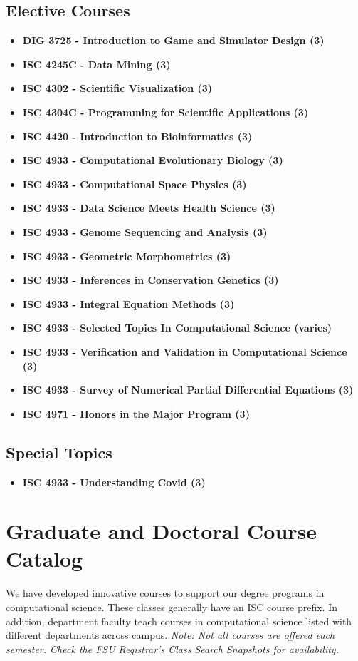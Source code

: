 \documentclass[12pt,a4paper]{article}
\begin{document}
\subsection*{Elective Courses}
\begin{itemize}
    \item \textbf{DIG 3725 - Introduction to Game and Simulator Design (3)}
    \item \textbf{ISC 4245C - Data Mining (3)}
    \item \textbf{ISC 4302 - Scientific Visualization (3)}
    \item \textbf{ISC 4304C - Programming for Scientific Applications (3)}
    \item \textbf{ISC 4420 - Introduction to Bioinformatics (3)}
    \item \textbf{ISC 4933 - Computational Evolutionary Biology (3)}
    \item \textbf{ISC 4933 - Computational Space Physics (3)}
    \item \textbf{ISC 4933 - Data Science Meets Health Science (3)}
    \item \textbf{ISC 4933 - Genome Sequencing and Analysis (3)}
    \item \textbf{ISC 4933 - Geometric Morphometrics (3)}
    \item \textbf{ISC 4933 - Inferences in Conservation Genetics (3)}
    \item \textbf{ISC 4933 - Integral Equation Methods (3)}
    \item \textbf{ISC 4933 - Selected Topics In Computational Science (varies)}
    \item \textbf{ISC 4933 - Verification and Validation in Computational Science (3)}
    \item \textbf{ISC 4933 - Survey of Numerical Partial Differential Equations (3)}
    \item \textbf{ISC 4971 - Honors in the Major Program (3)}
\end{itemize}

\subsection*{Special Topics}
\begin{itemize}
    \item \textbf{ISC 4933 - Understanding Covid (3)}
\end{itemize}
\newpage

\section{Graduate and Doctoral Course Catalog}
We have developed innovative courses to support our degree programs in computational science. These classes generally have an ISC course prefix. In addition, department faculty teach courses in computational science listed with different departments across campus.
\textit{Note: Not all courses are offered each semester. Check the FSU Registrar's Class Search Snapshots for availability.}
\end{document}
